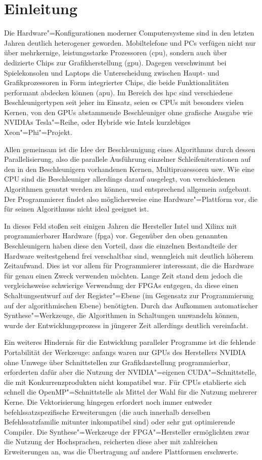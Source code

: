 \chapter{Einleitung}\label{einleitung}

Die Hardware"=Konfigurationen moderner Computersysteme sind in den letzten
Jahren deutlich heterogener geworden. Mobiltelefone und PCs verfügen nicht nur
über mehrkernige, leistungsstarke Prozessoren (\gls{cpu}), sondern auch über
dedizierte Chips zur Grafikherstellung (\gls{gpu}). Dagegen verschwimmt bei
Spielekonsolen und Laptops die Unterscheidung zwischen Haupt- und
Grafikprozessoren in Form integrierter Chips, die beide Funktionalitäten
performant abdecken können (\gls{apu}). Im Bereich des \gls{hpc} sind
verschiedene Beschleunigertypen seit jeher im Einsatz, seien es CPUs mit
besonders vielen Kernen, von den GPUs abstammende Beschleuniger ohne grafische
Ausgabe wie NVIDIAs Tesla"=Reihe, oder Hybride wie Intels
kurzlebiges Xeon"=Phi"=Projekt.

Allen gemeinsam ist die Idee der Beschleunigung eines Algorithmus durch dessen
Parallelisierung, also die parallele Ausführung einzelner Schleifeniterationen
auf den in den Beschleunigern vorhandenen Kernen, Multiprozessoren usw. Wie eine
CPU sind die Beschleuniger allerdings darauf ausgelegt, von verschiedenen
Algorithmen genutzt werden zu können, und entsprechend allgemein aufgebaut. Der
Programmierer findet also möglicherweise eine Hardware"=Plattform vor, die für
seinen Algorithmus nicht ideal geeignet ist.

In dieses Feld stoßen seit einigen Jahren die Hersteller Intel und Xilinx mit
programmierbarer Hardware (\gls{fpga}) vor. Gegenüber den oben genannten
Beschleunigern haben diese den Vorteil, dass die einzelnen Bestandteile der
Hardware weitestgehend frei verschaltbar sind, wenngleich mit deutlich höherem
Zeitaufwand. Dies ist vor allem für Programmierer interessant, die die Hardware
für genau einen Zweck verwenden möchten. Lange Zeit stand dem jedoch die
vergleichsweise schwierige Verwendung der FPGAs entgegen, da diese einen
Schaltungsentwurf auf der Register"=Ebene (im Gegensatz zur Programmierung auf
der algorithmischen Ebene) benötigten. Durch das Aufkommen automatischer
Synthese"=Werkzeuge, die Algorithmen in Schaltungen umwandeln können, wurde der
Entwicklungsprozess in jüngerer Zeit allerdings deutlich vereinfacht.

Ein weiteres Hindernis für die Entwicklung paralleler Programme ist die
fehlende Portabilität der Werkzeuge: anfangs waren nur GPUs des Herstellers
NVIDIA ohne Umwege über Schnittstellen zur Grafikdarstellung programmierbar,
erforderten dafür aber die Nutzung der NVIDIA"=eigenen CUDA"=Schnittstelle, die
mit Konkurrenzprodukten nicht kompatibel war. Für CPUs etablierte sich schnell
die OpenMP"=Schnittstelle als Mittel der Wahl für die Nutzung mehrerer Kerne.
Die Vektorisierung hingegen erfordert noch immer entweder befehlssatzspezifische
Erweiterungen (die auch innerhalb derselben Befehlssatzfamilie mitunter
inkompatibel sind) oder sehr gut optimierende Compiler. Die Synthese"=Werkzeuge
der FPGA"=Hersteller ermöglichten zwar die Nutzung der Hochsprachen, reicherten
diese aber mit zahlreichen Erweiterungen an, was die Übertragung auf andere
Plattformen erschwerte.

